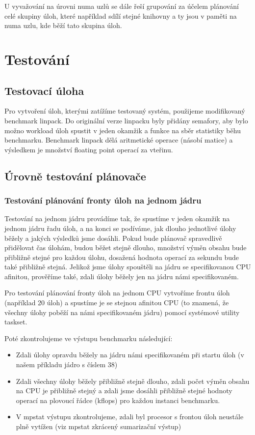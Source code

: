 \documentclass[
  field=ainfk,
  biblatex,
  glossaries,
  index
]{kidiplom}
\begin{document}
U vyvažování na úrovni numa uzlů se dále řeší grupování za účelem plánování celé skupiny úloh, které například sdílí stejné knihovny a ty jsou v paměti na numa uzlu, kde běží tato skupina úloh. 


\section{Testování}

\subsection{Testovací úloha}
Pro vytvoření úloh, kterými zatížíme testovaný systém, použijeme modifikovaný benchmark linpack. Do originální verze linpacku byly přidány semafory, aby bylo možno workload úloh spustit v jeden okamžik a funkce na sběr statistiky běhu benchmarku. Benchmark linpack dělá aritmetické operace (násobí matice) a výsledkem je množství floating point operací za vteřinu. 

\subsection{Úrovně testování plánovače}

\subsubsection{Testování plánování fronty úloh na jednom jádru}

Testování na jednom jádru provádíme tak, že spustíme v jeden okamžik na jednom jádru řadu úloh, a na konci se podíváme, jak dlouho jednotlivé úlohy běžely a jakých výsledků jsme dosáhli. Pokud bude plánovač spravedlivě přidělovat čas úlohám, budou běžet stejně dlouho, množství výměn obsahu bude přibližně stejné pro každou úlohu, dosažená hodnota operací za sekundu bude také přibližně stejná. Jelikož jsme úlohy spouštěli na jádru se specifikovanou CPU afinitou, prověříme také, zdali úlohy běžely jen na jádru námi specifikovaném.

Pro testování plánování fronty úloh na jednom CPU vytvoříme frontu úloh (například 20 úloh) a spustíme je se stejnou afinitou CPU (to znamená, že všechny úlohy poběží na námi specifikovaném jádru) pomocí systémové utility taskset.

Poté zkontrolujeme ve výstupu benchmarku následující:
\begin{itemize}
\item Zdali úlohy opravdu běžely na jádru námi specifikovaném při startu úloh (v našem příkladu jádro s číslem 38)
\item Zdali všechny úlohy běžely přibližně stejně dlouho, zdali počet výměn obsahu na CPU je přibližně stejný  a zdali jsme dosáhli přibližně stejné hodnoty operací na plovoucí řádce (kflops) pro každou instanci benchmarku.
\item V mpstat výstupu zkontrolujeme, zdali byl procesor s frontou úloh neustále plně vytížen (viz mpstat zkrácený sumarizační výstup)\\
\end{itemize}
\end{document}
